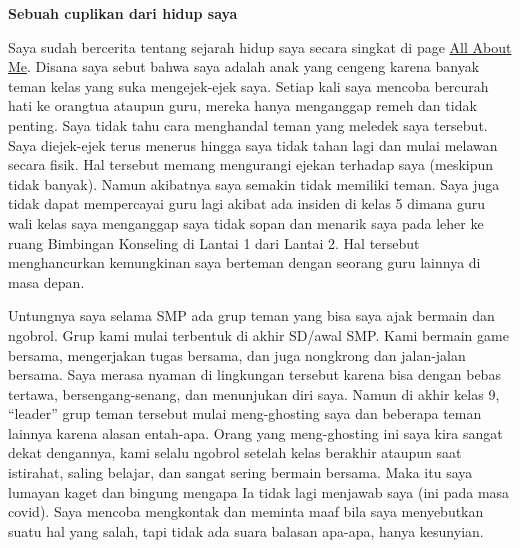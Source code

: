 \documentclass[
  letterpaper,
  DIV=11,
  numbers=noendperiod]{scrreprt}
\begin{document}
\textbf{Sebuah cuplikan dari hidup saya}

Saya sudah bercerita tentang sejarah hidup saya secara singkat di page
\hyperref[uts-1-all-about-me]{All About Me}. Disana saya sebut bahwa
saya adalah anak yang cengeng karena banyak teman kelas yang suka
mengejek-ejek saya. Setiap kali saya mencoba bercurah hati ke orangtua
ataupun guru, mereka hanya menganggap remeh dan tidak penting. Saya
tidak tahu cara menghandal teman yang meledek saya tersebut. Saya
diejek-ejek terus menerus hingga saya tidak tahan lagi dan mulai melawan
secara fisik. Hal tersebut memang mengurangi ejekan terhadap saya
(meskipun tidak banyak). Namun akibatnya saya semakin tidak memiliki
teman. Saya juga tidak dapat mempercayai guru lagi akibat ada insiden di
kelas 5 dimana guru wali kelas saya menganggap saya tidak sopan dan
menarik saya pada leher ke ruang Bimbingan Konseling di Lantai 1 dari
Lantai 2. Hal tersebut menghancurkan kemungkinan saya berteman dengan
seorang guru lainnya di masa depan.

Untungnya saya selama SMP ada grup teman yang bisa saya ajak bermain dan
ngobrol. Grup kami mulai terbentuk di akhir SD/awal SMP. Kami bermain
game bersama, mengerjakan tugas bersama, dan juga nongkrong dan
jalan-jalan bersama. Saya merasa nyaman di lingkungan tersebut karena
bisa dengan bebas tertawa, bersengang-senang, dan menunjukan diri saya.
Namun di akhir kelas 9, ``leader'' grup teman tersebut mulai
meng-ghosting saya dan beberapa teman lainnya karena alasan entah-apa.
Orang yang meng-ghosting ini saya kira sangat dekat dengannya, kami
selalu ngobrol setelah kelas berakhir ataupun saat istirahat, saling
belajar, dan sangat sering bermain bersama. Maka itu saya lumayan kaget
dan bingung mengapa Ia tidak lagi menjawab saya (ini pada masa covid).
Saya mencoba mengkontak dan meminta maaf bila saya menyebutkan suatu hal
yang salah, tapi tidak ada suara balasan apa-apa, hanya kesunyian.
\end{document}
